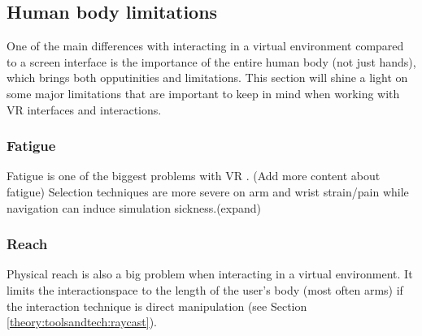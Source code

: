 \subsection{Human body limitations}
\label{theory:bodyLimits}
One of the main differences with interacting in a virtual environment compared to a screen interface is the importance of the entire human body (not just hands), which brings both opputinities and limitations. This section will shine a light on some major limitations that are important to keep in mind when working with VR interfaces and interactions.
\subsubsection{Fatigue}
Fatigue is one of the biggest problems with VR \cite{limitations:burdea2003virtual}. (Add more content about fatigue)
Selection techniques are more severe on arm and wrist strain/pain while navigation can induce simulation sickness.(expand)
\subsubsection{Reach}
Physical reach is also a big problem when interacting in a virtual environment. It limits the interactionspace to the length of the user's body (most often arms) if the interaction technique is direct manipulation (see Section \ref{theory:toolsandtech:raycast}).
